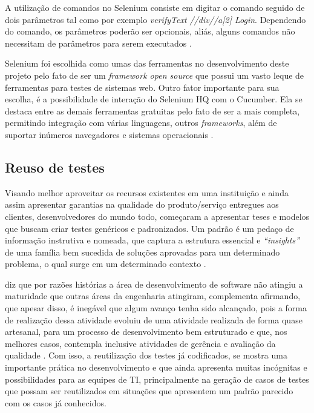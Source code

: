 \documentclass[12pt]{article}
\begin{document}
	A  utilização  de  comandos  no  Selenium  consiste  em  digitar  o  comando  seguido  de  dois parâmetros  tal  como  por  exemplo \emph{verifyText //div//a[2] Login}. Dependendo  do  comando,  os parâmetros
	poderão ser opcionais, aliás, alguns comandos não necessitam de parâmetros para serem executados \cite{sixpenceautomatizaccao}.

	Selenium foi escolhida como umas das ferramentas no desenvolvimento deste projeto pelo fato de ser um \emph{framework open source} que possui um vasto leque de ferramentas para testes de sistemas web. Outro fator
	importante para sua escolha, é a possibilidade de interação do Selenium HQ com o Cucumber. Ela  se  destaca  entre  as demais ferramentas  gratuitas pelo fato de ser a mais completa, permitindo integração com
	várias linguagens,  outros \emph{frameworks}, além de suportar inúmeros navegadores e sistemas operacionais \cite{pereiraestudoselenium}.

	\subsection{Reuso de testes}

	Visando melhor aproveitar os recursos existentes em uma instituição e ainda assim apresentar garantias na qualidade do produto/serviço entregues aos clientes, desenvolvedores do mundo todo, começaram a apresentar
	teses e modelos que buscam criar testes genéricos e padronizados. Um padrão é um pedaço de informação instrutiva e nomeada, que captura a estrutura essencial
	e \emph{“insights”} de uma família bem sucedida de soluções aprovadas para um determinado problema, o qual surge em um determinado contexto \cite{cagnin2004reuso}.

	\citeauthor{guizzardi2000desenvolvimento} diz que por razões histórias a área de desenvolvimento de software não atingiu a maturidade que outras áreas da engenharia atingiram, complementa afirmando,
	que apesar disso, é inegável que algum avanço tenha sido alcançado, pois a forma de realização dessa atividade evoluiu de uma atividade realizada de forma quase artesanal, para um processo de
	desenvolvimento bem estruturado e que, nos melhores casos, contempla inclusive atividades de gerência e avaliação da qualidade \cite{guizzardi2000desenvolvimento}.
	Com isso, a reutilização dos testes já codificados, se mostra uma importante prática no desenvolvimento e que ainda apresenta muitas incógnitas e possibilidades para as equipes de TI,
	principalmente na geração de casos de testes que possam ser reutilizados em situações que apresentem um padrão parecido com os casos já conhecidos.
\end{document}
